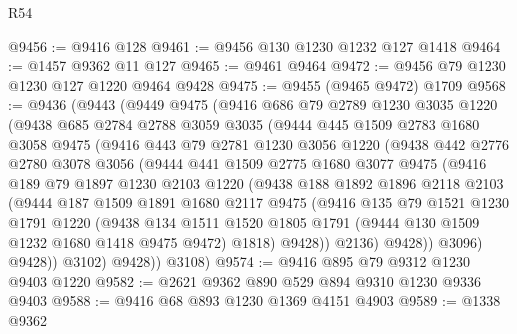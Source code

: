 \begin{lexlean}{R54}
\begin{coremodule}
@9456 := @9416 @128
@9461 := @9456 @130 @1230 @1232 @127 @1418
@9464 := @1457 @9362 @11 @127
@9465 := @9461 @9464
@9472 := @9456 @79 @1230 @1230 @127 @1220 @9464 @9428
@9475 := @9455 (@9465 @9472) @1709
@9568 := @9436
    (@9443
      (@9449
        @9475
        (@9416
          @686
          @79
          @2789
          @1230
          @3035
          @1220
          (@9438
            @685
            @2784
            @2788
            @3059
            @3035
            (@9444
              @445
              @1509
              @2783
              @1680
              @3058
              @9475
              (@9416
                @443
                @79
                @2781
                @1230
                @3056
                @1220
                (@9438
                  @442
                  @2776
                  @2780
                  @3078
                  @3056
                  (@9444
                    @441
                    @1509
                    @2775
                    @1680
                    @3077
                    @9475
                    (@9416
                      @189
                      @79
                      @1897
                      @1230
                      @2103
                      @1220
                      (@9438
                        @188
                        @1892
                        @1896
                        @2118
                        @2103
                        (@9444
                          @187
                          @1509
                          @1891
                          @1680
                          @2117
                          @9475
                          (@9416
                            @135
                            @79
                            @1521
                            @1230
                            @1791
                            @1220
                            (@9438
                              @134
                              @1511
                              @1520
                              @1805
                              @1791
                              (@9444 @130 @1509 @1232 @1680 @1418 @9475 @9472)
                              @1818)
                            @9428))
                        @2136)
                      @9428))
                  @3096)
                @9428))
            @3102)
          @9428))
      @3108)
@9574 := @9416 @895 @79 @9312 @1230 @9403 @1220
@9582 := @2621 @9362 @890 @529 @894 @9310 @1230 @9336 @9403
@9588 := @9416 @68 @893 @1230 @1369 @4151 @4903
@9589 := @1338 @9362

\end{coremodule}
\end{lexlean}
